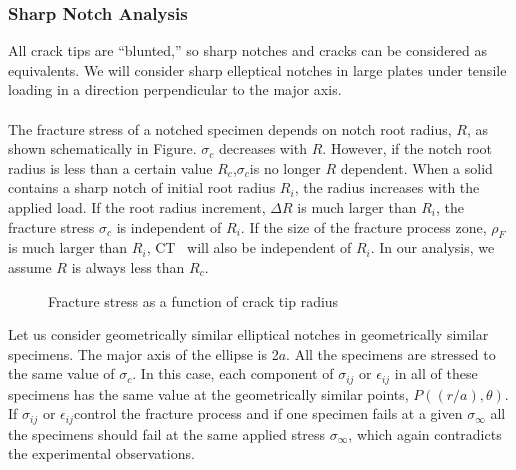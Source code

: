 \documentclass[11pt]{article}
\begin{document}
\subsubsection{Sharp Notch Analysis}
All crack tips are “blunted,” so sharp notches and cracks can be considered as equivalents. We will
consider sharp elleptical notches in large plates under tensile loading in a direction perpendicular to the
major axis.\\\\
The fracture stress of a notched specimen depends on notch root radius, $R$, as shown schematically
in Figure. $\sigma_c$ decreases with $R$. However, if the notch root radius is less than a certain value $R_c$,$\sigma_c$is no
longer $R$ dependent. When a solid contains a sharp notch of initial root radius $R_i$, the radius increases
with the applied load. If the root radius increment, $\Delta R$ is much larger than $R_i$, the fracture stress $\sigma_c$ is
independent of $R_i$. If the size of the fracture process zone, $\rho_F$ is much larger than $R_i$, CT~ will also be
independent of $R_i$. In our analysis, we assume $R$ is always less than $R_c$.

\begin{figure}[H]
    \centering
    \captionsetup{labelformat=empty}
    \caption{Fracture stress as a function of crack tip radius}
\end{figure}

Let us consider geometrically similar elliptical notches in geometrically similar specimens. The major
axis of the ellipse is 2$a$. All the specimens are stressed to the same value of $\sigma_c$. In this case, each
component of $\sigma_{ij}$ or $\epsilon_{ij}$ in all of these specimens has the same value at the geometrically similar points,
$P((r/a), \theta)$. If $\sigma_{ij}$ or $\epsilon_{ij} $control the fracture process and if one specimen fails at a given $\sigma_\infty$ all the
specimens should fail at the same applied stress $\sigma_\infty$, which again contradicts the experimental observations.
\end{document}

